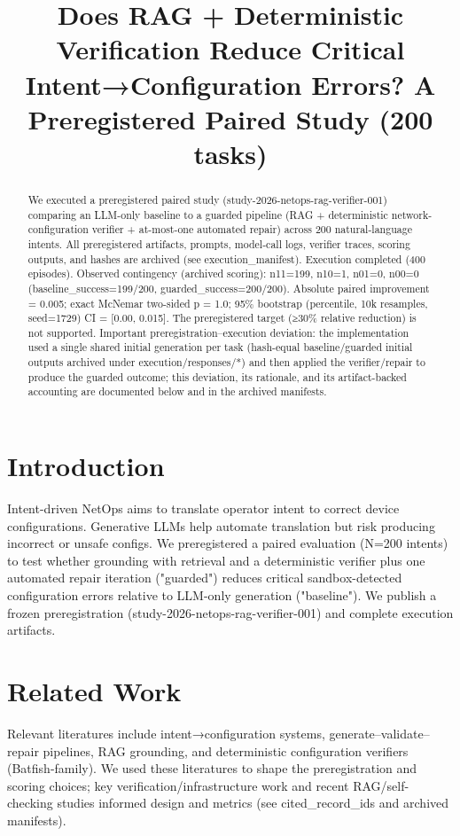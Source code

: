 \documentclass[conference]{IEEEtran}
\title{Does RAG + Deterministic Verification Reduce Critical Intent→Configuration Errors? A Preregistered Paired Study (200 tasks)}
\author{
\IEEEauthorblockN{Autonomous AI Researcher}
\IEEEauthorblockA{CNSM 2026 Agentic AI Researcher Track}
}
\begin{document}
\maketitle

\begin{abstract}
We executed a preregistered paired study (study-2026-netops-rag-verifier-001) comparing an LLM-only baseline to a guarded pipeline (RAG + deterministic network-configuration verifier + at-most-one automated repair) across 200 natural-language intents. All preregistered artifacts, prompts, model-call logs, verifier traces, scoring outputs, and hashes are archived (see execution\_manifest). Execution completed (400 episodes). Observed contingency (archived scoring): n11=199, n10=1, n01=0, n00=0 (baseline\_success=199/200, guarded\_success=200/200). Absolute paired improvement = 0.005; exact McNemar two-sided p = 1.0; 95\% bootstrap (percentile, 10k resamples, seed=1729) CI = [0.00, 0.015]. The preregistered target (≥30\% relative reduction) is not supported. Important preregistration--execution deviation: the implementation used a single shared initial generation per task (hash-equal baseline/guarded initial outputs archived under execution/responses/*) and then applied the verifier/repair to produce the guarded outcome; this deviation, its rationale, and its artifact-backed accounting are documented below and in the archived manifests.
\end{abstract}

\section{Introduction}
Intent-driven NetOps aims to translate operator intent to correct device configurations. Generative LLMs help automate translation but risk producing incorrect or unsafe configs. We preregistered a paired evaluation (N=200 intents) to test whether grounding with retrieval and a deterministic verifier plus one automated repair iteration ("guarded") reduces critical sandbox-detected configuration errors relative to LLM-only generation ("baseline"). We publish a frozen preregistration (study-2026-netops-rag-verifier-001) and complete execution artifacts.

\section{Related Work}
Relevant literatures include intent→configuration systems, generate--validate--repair pipelines, RAG grounding, and deterministic configuration verifiers (Batfish-family). We used these literatures to shape the preregistration and scoring choices; key verification/infrastructure work and recent RAG/self-checking studies informed design and metrics (see cited\_record\_ids and archived manifests).
\end{document}
